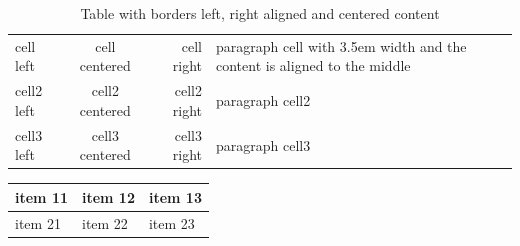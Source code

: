     \begin{table}[h]
        \centering  %
        \begin{tabular}{|| l | c | r | m{4.2em} ||}
            \hline  %
            cell left & cell centered & cell right & paragraph cell with 3.5em width and the content is aligned to the middle \\
            \cline{3-4}
            cell2 left & cell2 centered & cell2 right & paragraph cell2 \\
            \hline
            \hline
            cell3 left & cell3 centered & cell3 right & paragraph cell3 \\
            \hline 
        \end{tabular}
        \caption{Table with borders left, right aligned and centered content}
        \label{table:intermediate_table}
    \end{table}

    \begin{tabularx}{0.8\textwidth} { %
        | >{\raggedright\arraybackslash}X
        | >{\centering\arraybackslash}X
        | >{\raggedleft\arraybackslash}X |
    }
    \hline
    item 11 & item 12 & item 13 \\
    \hline
    item 21 & item 22 & item 23 \\
    \hline
    \end{tabularx}


